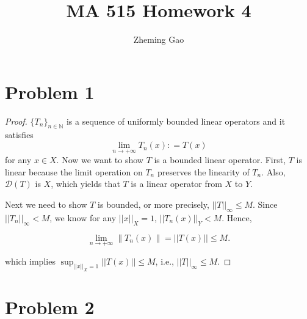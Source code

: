 \documentclass[12pt]{article}
\begin{document}
 
 
\title{MA 515 Homework 4}
\author{Zheming Gao}
\maketitle

\section*{Problem 1}

\begin{proof}

$\{T_n\}_{n\in\mathbb N}$ is a sequence of uniformly bounded linear operators and it satisfies 
$$
\lim_{n\rightarrow +\infty} T_n(x) : = T(x)
$$ 
for any $x\in X$. Now we want to show $T$ is a bounded linear operator. First, $T$ is linear because the limit operation on $T_n$ preserves the linearity of $T_n$. Also, $\mathcal{D}(T)$ is  $X$, which yields that $T$ is a linear operator from $X$ to $Y$.

Next we need to show $T$ is bounded, or more precisely, $||T||_\infty \leqslant M$. Since $||T_n||_\infty < M$, we know for any $||x||_X = 1$, $||T_n(x)||_Y < M$. Hence, 

$$
\lim_{n\rightarrow +\infty} \left \|T_n(x)\right\|  = ||T(x)|| \leqslant M.
$$

which implies $\sup_{||x||_X = 1} ||T(x)|| \leqslant M$, i.e., $||T||_\infty \leqslant M$.

\end{proof}


\section*{Problem 2}
\end{document}
